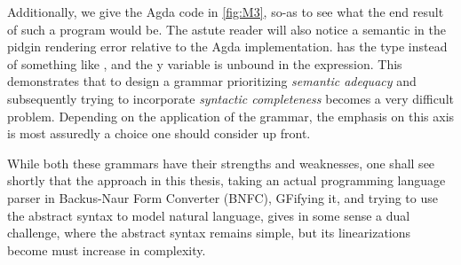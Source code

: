 







% 


Additionally, we give the Agda code in \autoref{fig:M3}, so-as to see what the
end result of such a program would be. The astute reader will also notice a
semantic in the pidgin rendering error relative to the Agda implementation.
 has the type  instead of something like
, and the y variable is unbound in the 
expression. This demonstrates that to design a grammar prioritizing
\emph{semantic adequacy} and subsequently trying to incorporate \emph{syntactic
completeness} becomes a very difficult problem. Depending on the application of
the grammar, the emphasis on this axis is most assuredly a choice one should
consider up front.

While both these grammars have their strengths and weaknesses, one shall see
shortly that the approach in this thesis, taking an actual programming language
parser in Backus-Naur Form Converter (BNFC), GFifying it, and trying to use the
abstract syntax to model natural language, gives in some sense a dual challenge,
where the abstract syntax remains simple, but its linearizations become
must increase in complexity.


